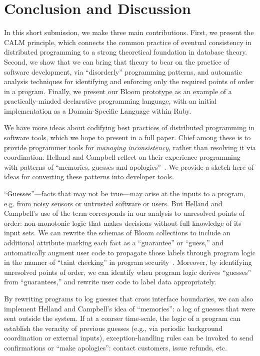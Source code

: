 \section{Conclusion and Discussion}
\label{sec:conclusion}
In this short submission, we make three main contributions.  First, we present
the CALM principle, which connects the common practice of eventual consistency
in distributed programming to a strong theoretical foundation in database
theory.  Second, we show that we can bring that theory to bear on the practice
of software development, via ``disorderly'' programming patterns, and automatic
analysis techniques for identifying and enforcing only the required points of
order in a program. Finally, we present our Bloom prototype as an example of a
practically-minded declarative programming language, with an initial
implementation as a Domain-Specific Language within Ruby.

We have more ideas about codifying best practices of distributed programming in software tools, which we hope to present in a full paper.  Chief among these is to provide programmer tools for \emph{managing inconsistency}, rather than resolving it via coordination.  Helland and Campbell reflect on their experience programming with patterns of ``memories, guesses and apologies''~\cite{quicksand}.  We provide a sketch here of ideas for converting these patterns into developer tools.

``Guesses''---facts that may not be true---may arise at the inputs to a program, e.g. from noisy sensors or untrusted software or users.  But Helland and Campbell's use of the term corresponds in our analysis to unresolved points of order: non-monotonic logic that makes decisions without full knowledge of its input sets.  We can rewrite the schemas of Bloom collections to include an additional attribute marking each fact as a ``guarantee'' or ``guess,'' and automatically augment user code to propagate those labels through program logic in the manner of ``taint checking'' in program security~\cite{taint,asbestos}.  Moreover, by identifying unresolved points of order, we can identify when program logic derives ``guesses'' from ``guarantees,'' and rewrite user code to label data appropriately.

By rewriting programs to log guesses that cross interface boundaries, we can also implement Helland and Campbell's idea of ``memories'': a log of guesses that were sent outside the system.  If at a coarser time-scale, the logic of a program can establish the veracity of previous guesses (e.g., via periodic background coordination or external inputs), exception-handling rules can be invoked to send confirmations or ``make apologies'': contact customers, issue refunds, etc.

